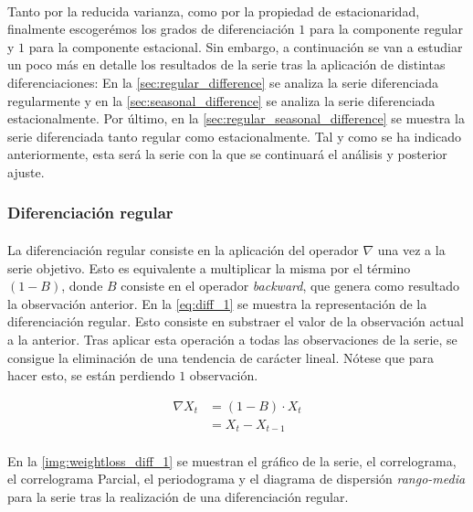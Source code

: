 \documentclass[a4paper, spanish]{article}
\begin{document}
      \paragraph{}
      Tanto por la reducida varianza, como por la propiedad de estacionaridad, finalmente escogerémos los grados de diferenciación $1$ para la componente regular y $1$ para la componente estacional. Sin embargo, a continuación se van a estudiar un poco más en detalle los resultados de la serie tras la aplicación de distintas diferenciaciones: En la \autoref{sec:regular_difference} se analiza la serie diferenciada regularmente y en la \autoref{sec:seasonal_difference} se analiza la serie diferenciada estacionalmente. Por último, en la \autoref{sec:regular_seasonal_difference} se muestra la serie diferenciada tanto regular como estacionalmente. Tal y como se ha indicado anteriormente, esta será la serie con la que se continuará el análisis y posterior ajuste.

      \subsubsection{Diferenciación regular}
      \label{sec:regular_difference}

        \paragraph{}
        La diferenciación regular consiste en la aplicación del operador $\nabla$ una vez a la serie objetivo. Esto es equivalente a multiplicar la misma por el término $(1 - B)$, donde $B$ consiste en el operador \emph{backward}, que genera como resultado la observación anterior. En la \autoref{eq:diff_1} se muestra la representación de la diferenciación regular. Esto consiste en substraer el valor de la observación actual a la anterior. Tras aplicar esta operación a todas las observaciones de la serie, se consigue la eliminación de una tendencia de carácter lineal. Nótese que para hacer esto, se están perdiendo $1$ observación.

        \begin{equation}
        \label{eq:diff_1}
          \begin{split}
            \nabla X_t
            &= (1 - B) \cdot X_t \\
            &= X_t - X_{t-1}
          \end{split}
        \end{equation}

        \paragraph{}
        En la \autoref{img:weightloss_diff_1} se muestran el gráfico de la serie, el correlograma, el correlograma Parcial, el periodograma y el diagrama de dispersión \emph{rango-media} para la serie tras la realización de una diferenciación regular.
\end{document}
